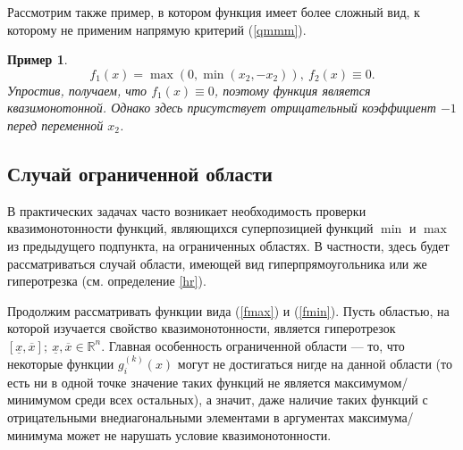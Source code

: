 \documentclass{article}
\newtheorem{example}{Пример}
\theoremstyle{definition}
\begin{document}
Рассмотрим также пример, в котором функция имеет более сложный вид, к которому не применим напрямую критерий (\ref{qmmm}).
\begin{example}
	\[f_1(x) = \max(0, \min(x_2, -x_2)),\ f_2(x) \equiv 0.\]
	Упростив, получаем, что \(f_1(x) \equiv 0\), поэтому функция является квазимонотонной. Однако здесь присутствует отрицательный коэффициент \(-1\) перед переменной \(x_2\).
\end{example}

\subsection{Случай ограниченной области}

В практических задачах часто возникает необходимость проверки квазимонотонности функций, являющихся суперпозицией функций \(\min\) и \(\max\) из предыдущего подпункта, на ограниченных областях. В частности, здесь будет рассматриваться случай области, имеющей вид гиперпрямоугольника или же гиперотрезка (см. определение \ref{hr}).

Продолжим рассматривать функции вида (\ref{fmax}) и (\ref{fmin}). Пусть областью, на которой изучается свойство квазимонотонности, является гиперотрезок \([\underline{x}, \overline{x}];\ \underline{x}, \overline{x} \in \mathbb{R}^n\). Главная особенность ограниченной области --- то, что некоторые функции \(g_i^{(k)}(x)\) могут не достигаться нигде на данной области (то есть ни в одной точке значение таких функций не является максимумом/минимумом среди всех остальных), а значит, даже наличие таких функций с отрицательными внедиагональными элементами в аргументах максимума/минимума может не нарушать условие квазимонотонности.
\end{document}
